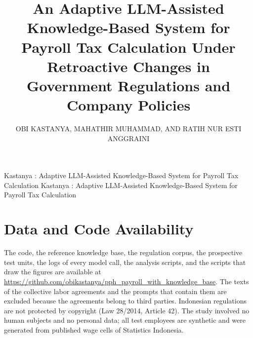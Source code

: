 \documentclass{ieeeaccess}
\begin{document}

\title{An Adaptive LLM-Assisted Knowledge-Based System for Payroll Tax Calculation Under Retroactive Changes in Government Regulations and Company Policies}

\author{\uppercase{Obi Kastanya},
\uppercase{Mahathir Muhammad},
AND \uppercase{Ratih Nur Esti Anggraini}}

\address[1]{Department of Informatics, Institut Teknologi Sepuluh Nopember, Surabaya 60111, Indonesia
(e-mail: 6025252015@student.its.ac.id; 6025252008@student.its.ac.id; ratih\_nea@if.its.ac.id)}

\markboth
{Kastanya \headeretal: Adaptive LLM-Assisted Knowledge-Based System for Payroll Tax Calculation}
{Kastanya \headeretal: Adaptive LLM-Assisted Knowledge-Based System for Payroll Tax Calculation}




\titlepgskip=-21pt

\maketitle










\section*{Data and Code Availability}
The code, the reference knowledge base, the regulation corpus, the prospective test units, the logs of every model call, the analysis scripts, and the scripts that draw the figures are available at \url{https://github.com/obikastanya/pph_payroll_with_knowledge_base}. The texts of the collective labor agreements and the prompts that contain them are excluded because the agreements belong to third parties. Indonesian regulations are not protected by copyright (Law 28/2014, Article 42). The study involved no human subjects and no personal data; all test employees are synthetic and were generated from published wage cells of Statistics Indonesia.
\end{document}
